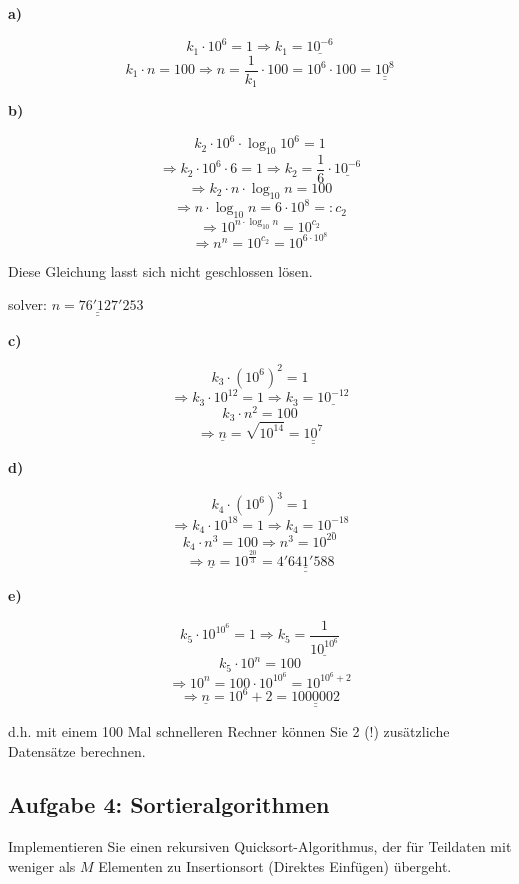 \begin{multicols}{2}
\noindent
\textbf{a)}

\medskip

$$ k_1 \cdot 10^6 = 1 \Longrightarrow k_1 = \underline{10^{-6}}$$
$$ k_1 \cdot n = 100 \Longrightarrow n = \frac{1}{k_1} \cdot 100 = 10^6 \cdot 100 = \underline{\underline{10^8}}$$

\medskip

\noindent
\textbf{b)}
\medskip

$$ k_2 \cdot 10^6\cdot \log_{10} 10^6 = 1$$
$$\Rightarrow k_2 \cdot 10^6 \cdot 6 = 1 \Rightarrow k_2 = \frac{1}{6} \cdot \underline{10^{-6}}$$
$$ \Rightarrow k_2 \cdot n \cdot \log_{10} n = 100$$
$$ \Rightarrow n \cdot \log_{10} n = 6 \cdot 10^8 =: c_2 $$
$$\Rightarrow 10^{n \cdot \log_{10} n} = 10^{c_2}$$
$$\Rightarrow n^n = 10^{c_2} = 10^{6\cdot10^8}$$
\medskip

Diese Gleichung lasst sich nicht geschlossen lösen.

solver: $\underline{\underline{n= 76'127'253}}$

\medskip

\noindent
\textbf{c)}
\medskip

$$ k_3 \cdot (10^6)^2 = 1 $$
$$\Rightarrow k_3 \cdot 10^{12} = 1 \Rightarrow k_3 = \underline{10^{-12}}$$
$$k_3 \cdot n^2 = 100$$
$$\Rightarrow \underline{n} = \sqrt{10^{14}} = \underline{\underline{10^7}}$$
\medskip

\noindent
\textbf{d)}
\medskip

$$ k_4\cdot (10^6)^3 = 1$$
$$ \Rightarrow k_4 \cdot 10^{18} =1 \Rightarrow k_4 = \underline{10^{-18}}$$
$$ k_4 \cdot n^3 = 100 \Rightarrow n^3 = 10^{20}$$
$$ \Rightarrow \underline{n} = 10^{\frac{20}{3}} = \underline{\underline{4'641'588}}$$
\medskip

\noindent
\textbf{e)}
\medskip
\medskip

$$ k_5 \cdot 10^{10^6} = 1 \Rightarrow k_5 = \underline{\frac{1}{10^{10^6}}}$$
$$ k_5 \cdot 10^{n} = 100$$
$$ \Rightarrow 10^n = 100 \cdot  10^{10^6} =  10^{10^6+2}$$
$$ \Rightarrow \underline{n} = 10^{6} + 2 = \underline{\underline{1000002}}$$

\medskip

d.h. mit einem 100 Mal schnelleren Rechner können Sie 2 (!) zusätzliche Datensätze berechnen.
\end{multicols}


\subsection{Aufgabe 4: Sortieralgorithmen}
Implementieren Sie einen rekursiven Quicksort-Algorithmus, der für Teildaten mit weniger als $M$ Elementen
zu Insertionsort (Direktes Einfügen) übergeht.

